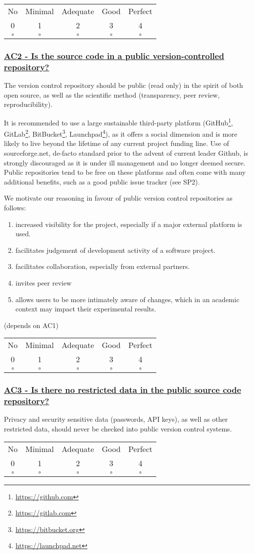 \documentclass[a4paper,11pt]{article}
\newcommand{\criterion}[2]{\subsubsection*{\underline{#1 - #2}}\label{id:#1}}
\newcommand\CheckTable{%
  \begin{tabular}{ccccc}
    No & Minimal & Adequate & Good & Perfect \\
    0 & 1 & 2 & 3 & 4 \\
    \hline
    $\square$ & $\square$ & $\square$ & $\square$ & $\square$ \\
  \end{tabular}%
}
\begin{document}
\CheckTable

\newcommand{\acTwoID}{AC2}
\newcommand{\acTwoText}{Is the source code in a public version-controlled repository?}
\criterion{\acTwoID}{\acTwoText}

The version control repository should be public (read only) in the spirit of both open
source, as well as the scientific method (transparency, peer review,
reproducibility). 

It is recommended to use a large sustainable third-party platform
(GitHub\footnote{\url{https://github.com}},
GitLab\footnote{\url{https://gitlab.com}},
BitBucket\footnote{\url{https://bitbucket.org}},
Launchpad\footnote{\url{https://launchpad.net}}), as it offers a social
dimension and is more likely to live beyond the lifetime of any current project
funding line. Use of sourceforge.net, de-facto standard prior to the advent of
current leader Github, is strongly discouraged as it is under ill management
and no longer deemed secure. Public repositories tend to be free on these platforms and
often come with many additional benefits, such as a good public issue tracker
(see SP2).

We motivate our reasoning in favour of public version control repositories as follows:

\begin{enumerate}
    \item increased visibility for the project, especially if a major external platform is used.
    \item facilitates judgement of development activity of a software project.
    \item facilitates collaboration, especially from external partners.
    \item invites peer review
    \item allows users to be more intimately aware of changes, which in an
        academic context may impact their experimental results.
\end{enumerate}

(depends on AC1)

\CheckTable

\newcommand{\acThreeID}{AC3}
\newcommand{\acThreeText}{Is there no restricted data in the public source code repository?}
\criterion{\acThreeID}{\acThreeText}

Privacy and security sensitive data (passwords, API keys), as well as other
restricted data, should never be checked into public version control systems.

\CheckTable
\end{document}
